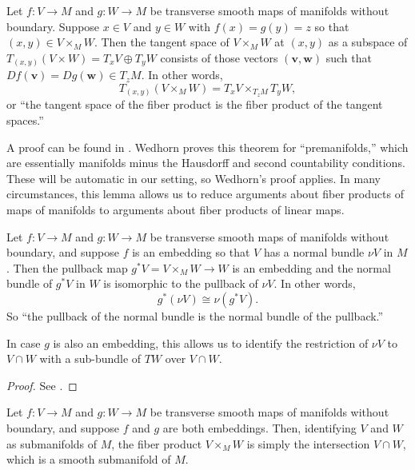 \begin{lemma}\label{L: tangent of pullbacks}
	Let $f \colon V\to M$ and $g \colon W\to M$ be transverse smooth maps of manifolds without boundary.
	Suppose $x\in V$ and $y\in W$ with $f(x)=g(y)=z$ so that $(x,y)\in V\times_MW$.
	Then the tangent space of $V\times_MW$ at $(x,y)$ as a subspace of $T_{(x,y)}(V\times W)= T_xV\oplus T_yW$ consists of those vectors $(\mathbf v,\mathbf w)$ such that $Df(\mathbf v)=Dg(\mathbf w)\in T_zM$.
	In other words,
	$$T_{(x,y)}(V\times_MW)=T_xV\times_{T_zM}T_yW,$$
	or ``the tangent space of the fiber product is the fiber product of the tangent spaces.''
\end{lemma}

A proof can be found in \cite[Theorem 5.47]{Wed16}.
Wedhorn proves this theorem for ``premanifolds,'' which are essentially manifolds minus the Hausdorff and second countability conditions.
These will be automatic in our setting, so Wedhorn's proof applies.
In many circumstances, this lemma allows us to reduce arguments about fiber products of maps of manifolds to arguments about fiber products of linear maps.

\begin{lemma}\label{L: normal pullback}
	Let $f \colon V\to M$ and $g \colon W\to M$ be transverse smooth maps of manifolds without boundary, and suppose $f$ is an embedding so that $V$ has a normal bundle $\nu V$ in $M$.
	Then the pullback map $g^*V=V\times_MW\to W$ is an embedding and the normal bundle of $g^*V$ in $W$ is isomorphic to the pullback of $\nu V$.
	In other words,
	$$g^*(\nu V)\cong \nu(g^*V).$$
	So ``the pullback of the normal bundle is the normal bundle of the pullback.''

	In case $g$ is also an embedding, this allows us to identify the restriction of $\nu V$ to $V\cap W$ with a sub-bundle of $TW$ over $V\cap W$.
\end{lemma}

\begin{proof}
	See \cite[Proposition IV.1.4]{Kos93}.
\end{proof}

\begin{lemma}
	Let $f \colon V\to M$ and $g \colon W\to M$ be transverse smooth maps of manifolds without boundary, and suppose $f$ and $g$ are both embeddings.
	Then, identifying $V$ and $W$ as submanifolds of $M$, the fiber product $V\times_MW$ is simply the intersection $V\cap W$, which is a smooth submanifold of $M$.
\end{lemma}

